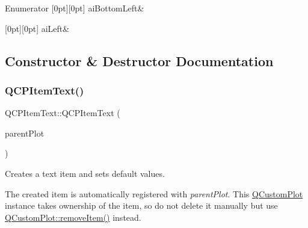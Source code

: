 \begin{DoxyEnumFields}{Enumerator}
[0pt][0pt]{}\mbox{\label{class_q_c_p_item_text_a14a84e58f72519c8ae1d7a4a1dd23f21a489ec73da5a18c15e98a4f9b17ed301f}} 
ai\+Bottom\+Left&\\
\hline

[0pt][0pt]{}\mbox{\label{class_q_c_p_item_text_a14a84e58f72519c8ae1d7a4a1dd23f21a7f1c1b8c574c753e300a4759915a9170}} 
ai\+Left&\\
\hline

\end{DoxyEnumFields}


\subsection{Constructor \& Destructor Documentation}
\mbox{\label{class_q_c_p_item_text_a77ff96a2972a00872ff8f8c67143abbe}} 
\subsubsection{\texorpdfstring{QCPItemText()}{QCPItemText()}}
{\footnotesize\ttfamily Q\+C\+P\+Item\+Text\+::\+Q\+C\+P\+Item\+Text (\begin{DoxyParamCaption}\item[{\mbox{\hyperlink{class_q_custom_plot}{Q\+Custom\+Plot}} $\ast$}]{parent\+Plot }\end{DoxyParamCaption})\hspace{0.3cm}{\ttfamily [explicit]}}

Creates a text item and sets default values.

The created item is automatically registered with {\itshape parent\+Plot}. This \mbox{\hyperlink{class_q_custom_plot}{Q\+Custom\+Plot}} instance takes ownership of the item, so do not delete it manually but use \mbox{\hyperlink{class_q_custom_plot_ae04446557292551e8fb6e2c106e1848d}{Q\+Custom\+Plot\+::remove\+Item()}} instead. \mbox{\label{class_q_c_p_item_text_a1efd41ca53d49042d4f4b63cf9615cb6}} 
